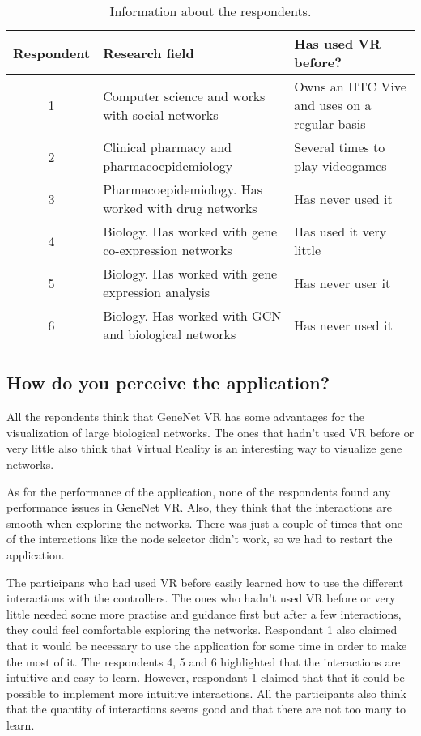 \begin{table}[h!]
\centering
\begin{tabularx}{\textwidth}{c X X}
\hline
Respondent & Research field & Has used VR before? \\
\hline
1 & Computer science and works with social networks  & Owns an HTC Vive and uses on a regular basis \\
2 & Clinical pharmacy and pharmacoepidemiology & Several times to play videogames \\
3 & Pharmacoepidemiology. Has worked with drug networks & Has never used it \\
4 & Biology. Has worked with gene co-expression networks & Has used it very little \\
5 & Biology. Has worked with gene expression analysis & Has never user it \\
6 & Biology. Has worked with GCN and biological networks & Has never used it \\
\hline
\end{tabularx}
\caption{Information about the respondents.}
\label{tab:respondents}
\end{table}

\subsection{How do you perceive the application?}
All the repondents think that GeneNet VR has some advantages for the visualization of large biological networks. The ones that hadn't used VR before or very little also think that Virtual Reality is an interesting way to visualize gene networks.

As for the performance of the application, none of the respondents found any performance issues in GeneNet VR. Also, they think that the interactions are smooth when exploring the networks. There was just a couple of times that one of the interactions like the node selector didn't work, so we had to restart the application.

The participans who had used VR before easily learned how to use the different interactions with the controllers. The ones who hadn't used VR before or very little needed some more practise and guidance first but after a few interactions, they could feel comfortable exploring the networks. Respondant 1 also claimed that it would be necessary to use the application for some time in order to make the most of it. The respondents 4, 5 and 6 highlighted that the interactions are intuitive and easy to learn. However, respondant 1 claimed that that it could be possible to implement more intuitive interactions. All the participants also think that the quantity of interactions seems good and that there are not too many to learn.

